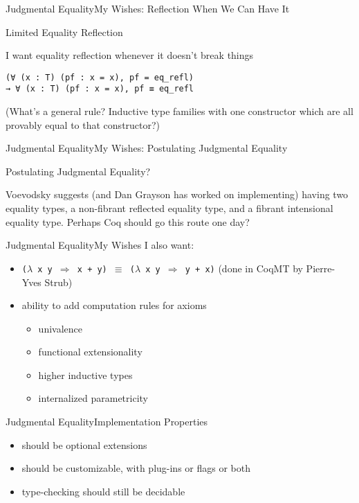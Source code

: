 \documentclass{beamer}
\begin{document}
\begin{frame}[fragile]{Judgmental Equality}{My Wishes: Reflection When We Can Have It}
  \Large
  \begin{center}
    Limited Equality Reflection
  \end{center}
  I want equality reflection whenever it doesn't break things
\begin{verbatim}
(∀ (x : T) (pf : x = x), pf = eq_refl)
→ ∀ (x : T) (pf : x = x), pf ≡ eq_refl    
\end{verbatim}
\pause
  (What's a general rule?  Inductive type families with one constructor which are all provably equal to that constructor?)
\end{frame}

\begin{frame}[fragile]{Judgmental Equality}{My Wishes: Postulating Judgmental Equality}
  \Large
  \begin{center}
    Postulating Judgmental Equality?
  \end{center}
  Voevodsky suggests (and Dan Grayson has worked on implementing) having two equality types, a non-fibrant reflected equality type, and a fibrant intensional equality type.  Perhaps Coq should go this route one day?
\end{frame}

\begin{frame}{Judgmental Equality}{My Wishes}
  \Large
  I also want:
  \begin{itemize}
    \item \texttt{($\lambda$ x y $\Longrightarrow$ x + y) $\equiv$ ($\lambda$ x y $\Longrightarrow$ y + x)} (done in CoqMT by Pierre-Yves Strub)
    \item ability to add computation rules for axioms \pause
      \begin{itemize} \large
        \item univalence \pause
        \item functional extensionality \pause
        \item higher inductive types \pause
        \item internalized parametricity
      \end{itemize}
  \end{itemize}
\end{frame}

\begin{frame}{Judgmental Equality}{Implementation Properties}
  \Large
  \begin{itemize}
    \item should be optional extensions \pause
    \item should be customizable, with plug-ins or flags or both \pause
    \item type-checking should still be decidable
  \end{itemize}
\end{frame}
\end{document}
